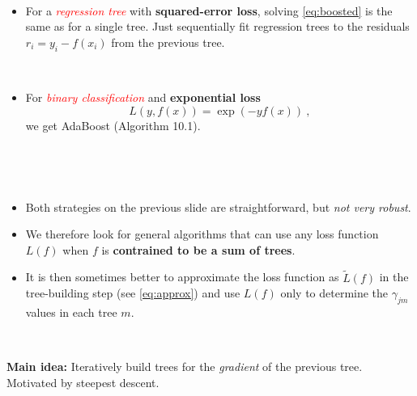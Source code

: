 \documentclass[
  10pt,
  ignorenonframetext,
]{beamer}
\providecommand{\tightlist}{%
  \setlength{\itemsep}{0pt}\setlength{\parskip}{0pt}}
\begin{document}
\begin{frame}
\(~\)

\begin{itemize}
\tightlist
\item
  For a \emph{\textcolor{red}{regression tree}} with
  \textbf{squared-error loss}, solving \eqref{eq:boosted} is the same as
  for a single tree. Just sequentially fit regression trees to the
  residuals \(r_i = y_i - f(x_i)\) from the previous tree.
\end{itemize}

\(~\)

\begin{itemize}
\tightlist
\item
  For \emph{\textcolor{red}{binary classification}} and
  \textbf{exponential loss} \[L(y,f(x))=\exp(-yf(x)) \ ,\] we get
  AdaBoost (Algorithm 10.1).
\end{itemize}

\(~\)
\end{frame}

\begin{frame}
\(~\)

\begin{itemize}
\tightlist
\item
  Both strategies on the previous slide are straightforward, but
  \emph{not very robust}.
\end{itemize}

\vspace{2mm}

\begin{itemize}
\tightlist
\item
  We therefore look for general algorithms that can use any loss
  function \(L(f)\) when \(f\) is \textbf{contrained to be a sum of
  trees}.
\end{itemize}

\vspace{2mm}

\begin{itemize}
\tightlist
\item
  It is then sometimes better to approximate the loss function as
  \(\tilde{L}(f)\) in the tree-building step (see \eqref{eq:approx}) and
  use \(L(f)\) only to determine the \(\gamma_{jm}\) values in each tree
  \(m\).
\end{itemize}

\(~\)

\textbf{Main idea:} Iteratively build trees for the \emph{gradient} of
the previous tree. Motivated by steepest descent.
\end{frame}
\end{document}
